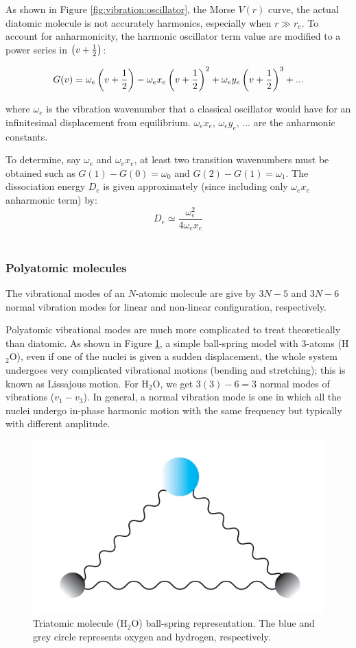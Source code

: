 As shown in Figure \ref{fig:vibration:oscillator}, the Morse $V(r)$ curve, the actual diatomic molecule is not accurately harmonics, especially when $r \gg r_e$. To account for anharmonicity, the harmonic oscillator term value are modified to a power series in $\left( v + \frac{1}{2} \right)$:

\[G(v) = \omega_e \left( v + \frac{1}{2} \right) - \omega_e x_e \left( v + \frac{1}{2} \right)^2 + \omega_e y_e \left( v + \frac{1}{2} \right)^3 + ...\]

where $\omega_e$ is the vibration wavenumber that a classical oscillator would have for an infinitesimal displacement from equilibrium. $\omega_e x_e$, $\omega_e y_e$, ... are the anharmonic constants.

To determine, say $\omega_e$ and $\omega_e x_e$, at least two transition wavenumbers must be obtained such as $G(1)-G(0)=\omega_0$ and $G(2)-G(1)=\omega_1$. The dissociation energy $D_e$ is given approximately (since including only $\omega_e x_e$ anharmonic term) by:
\[D_e \simeq \frac{\omega_e^2}{4\omega_e x_e}\]\\

\subsubsection{Polyatomic molecules}
\label{sec:mol-vibration:polyatomic}
The vibrational modes of an  $N$-atomic molecule are give by $3N-5$ and $3N-6$ normal vibration modes for linear and non-linear configuration, respectively.

Polyatomic vibrational modes are much more complicated to treat theoretically than diatomic. As shown in Figure \ref{fig:oscillator:water}, a simple ball-spring model with 3-atoms (H$_2$O), even if one of the nuclei is given a sudden displacement, the whole system undergoes very complicated vibrational motions (bending and stretching); this is known as Lissajous motion. For H$_2$O, we get $3(3)-6=3$ normal modes of vibrations ($v_1-v_3$). In general, a normal vibration mode is one in which all the nuclei undergo in-phase harmonic motion with the same frequency but typically with different amplitude.
\begin{figure}[!htb]
    \centering
    \includegraphics[scale=0.7]{figures/methods/harmonic-oscillator_polyatomic.png}
    \caption{Triatomic molecule (H$_2$O) ball-spring representation. The blue and grey circle represents oxygen and hydrogen, respectively.}
    \label{fig:oscillator:water}
\end{figure}

